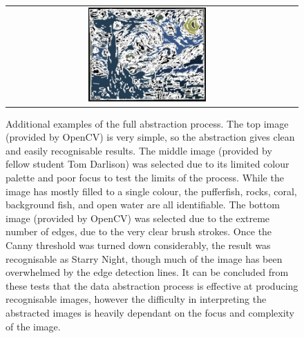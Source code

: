 \begin{figure}[ht]
\begin{center}
\begin{tabular}{ c c }
        \includegraphics[width=0.43\textwidth]{Figures/starry_nightDA.jpg} 
    \end{tabular}
    \caption[Additional examples of the full abstraction process]{Additional examples of the full abstraction process. The top image (provided by OpenCV) is very simple, so the abstraction gives clean and easily recognisable results. The middle image (provided by fellow student Tom Darlison) was selected due to its limited colour palette and poor focus to test the limits of the process. While the image has mostly filled to a single colour, the pufferfish, rocks, coral, background fish, and open water are all identifiable. The bottom image (provided by OpenCV) was selected due to the extreme number of edges, due to the very clear brush strokes. Once the Canny threshold was turned down considerably, the result was recognisable as Starry Night, though much of the image has been overwhelmed by the edge detection lines. It can be concluded from these tests that the data abstraction process is effective at producing recognisable images, however the difficulty in interpreting the abstracted images is heavily dependant on the focus and complexity of the image.}
    \label{fig:FinalExtras}
    \end{center}
\end{figure}